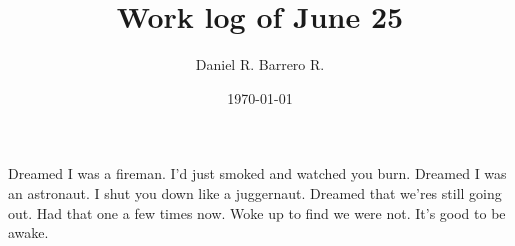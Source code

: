 \documentclass{amsart}
\title{Work log of June 25}
\author{Daniel R. Barrero R.}
\date{\today}
\begin{document}
\maketitle

\section{}

Dreamed I was a fireman. I'd just smoked and watched you burn. Dreamed I was an astronaut. I shut
you down like a juggernaut.
Dreamed that we'res still going out. Had that one a few times now.
Woke up to find we were not. It's good to be awake.
\end{document}
